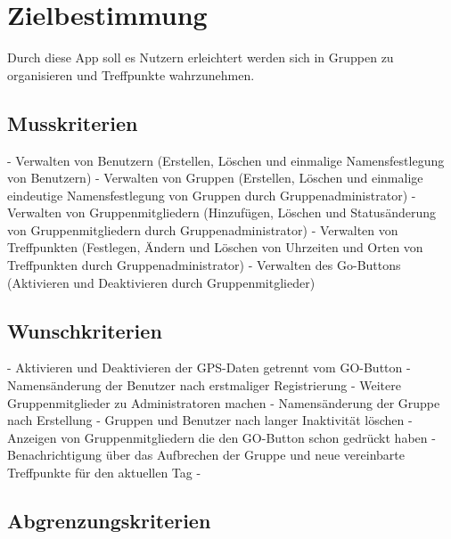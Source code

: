 \section{Zielbestimmung}
Durch diese App soll es Nutzern erleichtert werden sich in Gruppen zu organisieren und Treffpunkte wahrzunehmen.
	
\subsection{Musskriterien}
- 	Verwalten von Benutzern (Erstellen, Löschen und einmalige Namensfestlegung von Benutzern)
- 	Verwalten von Gruppen (Erstellen, Löschen und einmalige eindeutige Namensfestlegung von Gruppen durch Gruppenadministrator)
- 	Verwalten von Gruppenmitgliedern (Hinzufügen, Löschen und Statusänderung von Gruppenmitgliedern durch Gruppenadministrator)
- 	Verwalten von Treffpunkten (Festlegen, Ändern und Löschen von Uhrzeiten und Orten von Treffpunkten durch Gruppenadministrator)
- 	Verwalten des Go-Buttons (Aktivieren und Deaktivieren durch Gruppenmitglieder)
	
\subsection{Wunschkriterien}
-	Aktivieren und Deaktivieren der GPS-Daten getrennt vom GO-Button
-	Namensänderung der Benutzer nach erstmaliger Registrierung
- 	Weitere Gruppenmitglieder zu Administratoren machen
-	Namensänderung der Gruppe nach Erstellung
-	Gruppen und Benutzer nach langer Inaktivität löschen
- 	Anzeigen von Gruppenmitgliedern die den GO-Button schon gedrückt haben
- 	Benachrichtigung über das Aufbrechen der Gruppe und neue vereinbarte Treffpunkte für den aktuellen Tag
-
	
\subsection{Abgrenzungskriterien}


